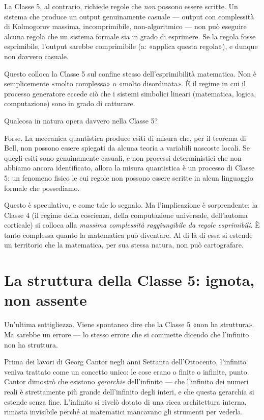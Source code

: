 \documentclass[11pt, twoside, openright]{book}
\begin{document}
La Classe 5, al contrario, richiede regole che \textit{non} possono essere scritte. Un sistema che produce un output genuinamente casuale --- output con complessità di Kolmogorov massima, incomprimibile, non-algoritmico --- non può eseguire alcuna regola che un sistema formale sia in grado di esprimere. Se la regola fosse esprimibile, l'output sarebbe comprimibile (a: «applica questa regola»), e dunque non davvero casuale.

Questo colloca la Classe 5 sul confine stesso dell'esprimibilità matematica. Non è semplicemente «molto complessa» o «molto disordinata». È il regime in cui il processo generatore eccede ciò che i sistemi simbolici lineari (matematica, logica, computazione) sono in grado di catturare.

Qualcosa in natura opera davvero nella Classe 5?

Forse. La meccanica quantistica produce esiti di misura che, per il teorema di Bell, non possono essere spiegati da alcuna teoria a variabili nascoste locali. Se quegli esiti sono genuinamente casuali, e non processi deterministici che non abbiamo ancora identificato, allora la misura quantistica è un processo di Classe 5: un fenomeno fisico le cui regole non possono essere scritte in alcun linguaggio formale che possediamo.

Questo è speculativo, e come tale lo segnalo. Ma l'implicazione è sorprendente: la Classe 4 (il regime della coscienza, della computazione universale, dell'automa corticale) si colloca alla \textit{massima complessità raggiungibile da regole esprimibili}. È tanto complessa quanto la matematica può diventare. Al di là di essa si estende un territorio che la matematica, per sua stessa natura, non può cartografare.

\section*{La struttura della Classe 5: ignota, non assente}

Un'ultima sottigliezza. Viene spontaneo dire che la Classe 5 «non ha struttura». Ma sarebbe un errore --- lo stesso errore che si commette dicendo che l'infinito non ha struttura.

Prima dei lavori di Georg Cantor negli anni Settanta dell'Ottocento, l'infinito veniva trattato come un concetto unico: le cose erano o finite o infinite, punto. Cantor dimostrò che esistono \textit{gerarchie} dell'infinito --- che l'infinito dei numeri reali è strettamente più grande dell'infinito degli interi, e che questa gerarchia si estende senza fine. L'infinito si rivelò dotato di una ricca architettura interna, rimasta invisibile perché ai matematici mancavano gli strumenti per vederla.
\end{document}
